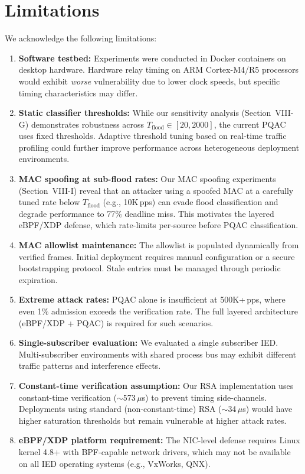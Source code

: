 \documentclass{ieeeaccess}
\begin{document}
\section{Limitations}

We acknowledge the following limitations:

\begin{enumerate}[leftmargin=*]
    \item \textbf{Software testbed:} Experiments were conducted in Docker containers on desktop hardware. Hardware relay timing on ARM Cortex-M4/R5 processors would exhibit \emph{worse} vulnerability due to lower clock speeds, but specific timing characteristics may differ.
    \item \textbf{Static classifier thresholds:} While our sensitivity analysis (Section~VIII-G) demonstrates robustness across $T_{\text{flood}} \in [20, 2000]$, the current PQAC uses fixed thresholds. Adaptive threshold tuning based on real-time traffic profiling could further improve performance across heterogeneous deployment environments.
    \item \textbf{MAC spoofing at sub-flood rates:} Our MAC spoofing experiments (Section~VIII-I) reveal that an attacker using a spoofed MAC at a carefully tuned rate below $T_{\text{flood}}$ (e.g., 10K\,pps) can evade flood classification and degrade performance to 77\% deadline miss. This motivates the layered eBPF/XDP defense, which rate-limits per-source before PQAC classification.
    \item \textbf{MAC allowlist maintenance:} The allowlist is populated dynamically from verified frames. Initial deployment requires manual configuration or a secure bootstrapping protocol. Stale entries must be managed through periodic expiration.
    \item \textbf{Extreme attack rates:} PQAC alone is insufficient at 500K+\,pps, where even 1\% admission exceeds the verification rate. The full layered architecture (eBPF/XDP + PQAC) is required for such scenarios.
    \item \textbf{Single-subscriber evaluation:} We evaluated a single subscriber IED. Multi-subscriber environments with shared process bus may exhibit different traffic patterns and interference effects.
    \item \textbf{Constant-time verification assumption:} Our RSA implementation uses constant-time verification ($\sim$573\,$\mu$s) to prevent timing side-channels. Deployments using standard (non-constant-time) RSA ($\sim$34\,$\mu$s) would have higher saturation thresholds but remain vulnerable at higher attack rates.
    \item \textbf{eBPF/XDP platform requirement:} The NIC-level defense requires Linux kernel 4.8+ with BPF-capable network drivers, which may not be available on all IED operating systems (e.g., VxWorks, QNX).
\end{enumerate}
\end{document}
